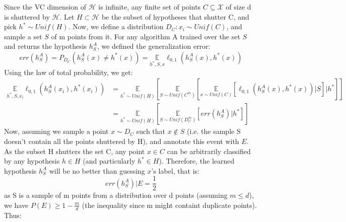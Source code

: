 \subsubsection{}
Since the VC dimension of $\mathcal{H}$ is infinite, any finite set of points $C \subseteq \mathcal{X} $ of size d is shuttered by $\mathcal{H}$. Let $H \subset \mathcal{H}$ be the subset of hypotheses that shutter C, and pick $h^* \sim Unif(H)$. Now, we define a distribution $D_C: x_i \sim Unif(C)$, and sample a set $S$ of m points from it. For any algorithm A trained over the set $S$ and returns the hypothesis $h_S^A$, we defined the generalization error:
\begin{equation*}
    \mathit{err}(h_S^A) = P_{D_C}(h_S^A(x) \neq h^*(x)) = \underset{h^*, S, x}{\mathbb{E}} \ell_{0,1}(h_S^A(x),h^*(x))
\end{equation*}
Using the law of total probability, we get:
\begin{equation*}
    \begin{split}        
        \underset{h^*, S, x_i}{\mathbb{E}} \ell_{0,1}(h_S^A(x_i),h^*(x_i)) &= \underset{h^* \sim Unif(H)}{\mathbb{E}} \left[\underset{S \sim Unif(C^m)}{\mathbb{E}} \left[\underset{x \sim Unif(C)}{\mathbb{E}} \left[\ell_{0,1}(h_S^A(x),h^*(x)) | S \right] | h^* \right] \right] \\
         &= \underset{h^* \sim Unif(H)}{\mathbb{E}} \left[\underset{S \sim Unif(D_C^m)}{\mathbb{E}}  \left[ \mathit{err}(h_S^A) | h^* \right] \right]
    \end{split}
\end{equation*}
Now, assuming we sample a point $x \sim D_C$ such that $x \notin S$ (i.e. the sample S doesn't contain all the points shuttered by H), and annotate this event with $E$. As the subset H shutters the set C, any point $x\in C$ can be arbitrarily classified by any hypothesis $h \in H$ (and particularly $h^*\in H$). Therefore, the learned hypothesis $h_S^A$ will be no better than guessing $x$'s label, that is:
\begin{equation*}
    \mathit{err}(h_S^A) | E = \frac{1}{2}
\end{equation*}
as S is a sample of m points from a distribution over d points (assuming $m \leq d$), we have $P(E) \geq 1 - \frac{m}{d}$ (the inequality since m might containt duplicate points). Thus:

